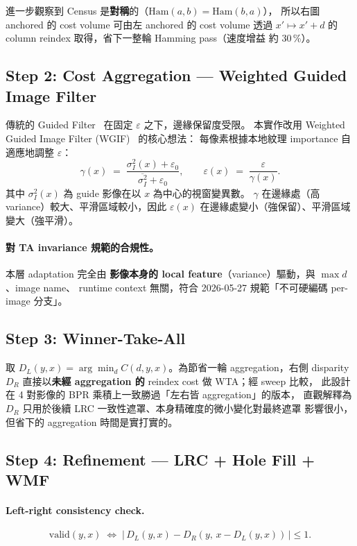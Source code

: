 \documentclass[11pt,a4paper]{article}
\begin{document}
進一步觀察到 Census 是\textbf{對稱}的（$\mathrm{Ham}(a,b)=\mathrm{Ham}(b,a)$），
所以右圖 anchored 的 cost volume 可由左 anchored 的 cost volume 透過
$x' \mapsto x' + d$ 的 column reindex 取得，省下一整輪 Hamming pass（速度增益
約 30\,\%）。

\subsection{Step 2: Cost Aggregation — Weighted Guided Image Filter}
\label{sec:basic-aggregation}
傳統的 Guided Filter~\cite{He2010} 在固定 $\varepsilon$ 之下，邊緣保留度受限。
本實作改用 Weighted Guided Image Filter (WGIF)~\cite{Li2015} 的核心想法：
每像素根據本地紋理 importance 自適應地調整 $\varepsilon$：
\begin{equation}
  \gamma(x) \;=\; \frac{\sigma_I^2(x) + \varepsilon_0}{\overline{\sigma_I^2} + \varepsilon_0},
  \qquad
  \varepsilon(x) \;=\; \frac{\varepsilon}{\gamma(x)}.
  \label{eq:wgif-eps}
\end{equation}
其中 $\sigma_I^2(x)$ 為 guide 影像在以 $x$ 為中心的視窗變異數。
$\gamma$ 在邊緣處（高 variance）較大、平滑區域較小，因此
$\varepsilon(x)$ 在邊緣處變小（強保留）、平滑區域變大（強平滑）。

\paragraph{對 TA invariance 規範的合規性。} 本層 adaptation 完全由
\textbf{影像本身的 local feature}（variance）驅動，與 $\max\!d$、image name、
runtime context 無關，符合 2026-05-27 規範「不可硬編碼 per-image 分支」。

\subsection{Step 3: Winner-Take-All}
取 $D_L(y,x) = \arg\!\min_d C(d,y,x)$。為節省一輪 aggregation，右側 disparity
$D_R$ 直接以\textbf{未經 aggregation 的} reindex cost 做 WTA；經 sweep 比較，
此設計在 4 對影像的 BPR 乘積上一致勝過「左右皆 aggregation」的版本，
直觀解釋為 $D_R$ 只用於後續 LRC 一致性遮罩、本身精確度的微小變化對最終遮罩
影響很小，但省下的 aggregation 時間是實打實的。

\subsection{Step 4: Refinement — LRC + Hole Fill + WMF}
\paragraph{Left-right consistency check.}
\begin{equation}
  \mathrm{valid}(y,x) \;\Leftrightarrow\; \big|\,D_L(y,x) - D_R(y,\,x{-}D_L(y,x))\,\big| \le 1.
\end{equation}
\end{document}
